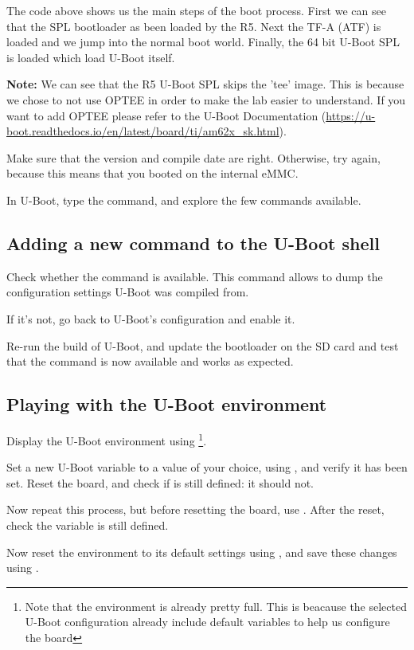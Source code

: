 The code above shows us the main steps of the boot process.
First we can see that the SPL bootloader as been loaded by the R5.
Next the TF-A (ATF) is loaded and we jump into the normal boot world.
Finally, the 64 bit U-Boot SPL is loaded which load U-Boot itself.

\textbf{Note:} We can see that the R5 U-Boot SPL skips the 'tee'
image. This is because we chose to not use OPTEE in order
to make the lab easier to understand. If you want to add OPTEE please refer
to the U-Boot Documentation
(\url{https://u-boot.readthedocs.io/en/latest/board/ti/am62x_sk.html}).

Make sure that the version and compile date are right. Otherwise, try
again, because this means that you booted on the internal eMMC.

In U-Boot, type the  command, and explore the few commands
available.

\subsection{Adding a new command to the U-Boot shell}

Check whether the  command is available. This command
allows to dump the configuration settings U-Boot was compiled from.

If it's not, go back to U-Boot's configuration and enable it.

Re-run the build of U-Boot, and update the bootloader on the SD card
and test that the command is now available and works as expected.

\subsection{Playing with the U-Boot environment}

Display the U-Boot environment using \footnote{Note that
the environment is already pretty full. This is beacause the selected
U-Boot configuration already include default variables to help us configure
the board}.

Set a new U-Boot variable  to a value of your choice, using
, and verify it has been set. Reset the board, and check
if  is still defined: it should not.

Now repeat this process, but before resetting the board, use
. After the reset, check the  variable is
still defined.

Now reset the environment to its default settings using , and save these changes using .

